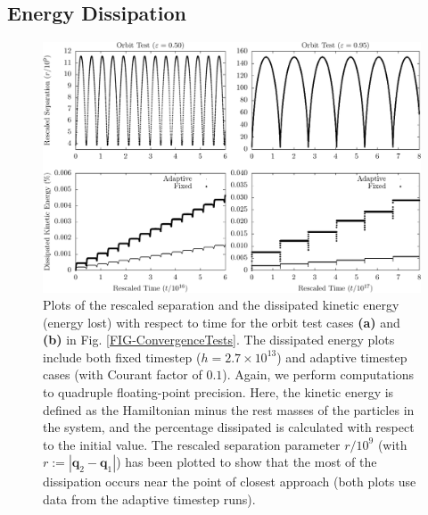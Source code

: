 \documentclass[aps,onecolumn,notitlepage,eqsecnum,nofootinbib,floatfix,superscriptaddress]{revtex4-1}
\begin{document}
\subsection{Energy Dissipation}
\label{sec_dissipation}

 \begin{figure}
 \includegraphics[width=\linewidth]{energy_tests.pdf}
\caption{Plots of the rescaled separation and the dissipated kinetic energy (energy lost) with respect to time for the orbit test cases \textbf{(a)} and \textbf{(b)} in Fig. \ref{FIG-ConvergenceTests}. The dissipated energy plots include both fixed timestep ($h=2.7 \times 10^{13}$) and adaptive timestep cases (with Courant factor of $0.1$). Again, we perform computations to quadruple floating-point precision. Here, the kinetic energy is defined as the Hamiltonian minus the rest masses of the particles in the system, and the percentage dissipated is calculated with respect to the initial value. The rescaled separation parameter $r/10^{9}$ (with $r:=|\textbf{q}_2-\textbf{q}_1|$) has been plotted to show that the most of the dissipation occurs near the point of closest approach (both plots use data from the adaptive timestep runs).}
\label{FIG-EnergyTests}
\end{figure}
\end{document}
